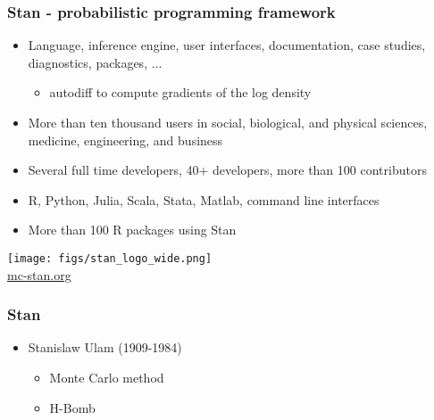 \documentclass[10pt]{beamer}
\begin{document}
\begin{frame}

  \frametitle{Stan - probabilistic programming framework}

   \begin{itemize}
   \item Language, inference engine, user interfaces, documentation,
     case studies, diagnostics, packages, ...
     \begin{itemize}
     \item autodiff to compute gradients of the log density
     \end{itemize}
   \item<2-> More than ten thousand users in social, biological, and
     physical sciences, medicine, engineering, and business

   \item<3-> Several full time developers, 40+ developers, more than 100 contributors
   \item<4-> R, Python, Julia, Scala, Stata, Matlab, command line interfaces
    \item<4-> More than 100 R packages using Stan
   \end{itemize}
  \vfill
  \begin{center}
    \texttt{[image: figs/stan\_logo\_wide.png]}\\
    \url{mc-stan.org}
  \end{center}
\end{frame}

\begin{frame}

\frametitle{Stan}

  \begin{itemize}
  \item Stanislaw Ulam (1909-1984)
    \begin{itemize}
    \item Monte Carlo method
    \item H-Bomb
    \end{itemize}
  \end{itemize}

\end{frame}
\end{document}
